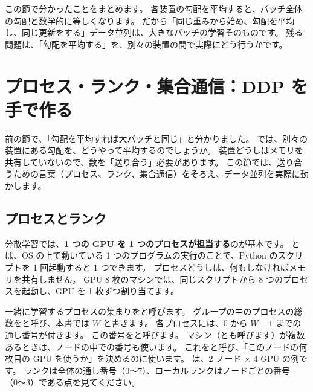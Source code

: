 この節で分かったことをまとめます。
各装置の勾配を平均すると、バッチ全体の勾配と数学的に等しくなります。
だから「同じ重みから始め、勾配を平均し、同じ更新をする」データ並列は、大きなバッチの学習そのものです。
残る問題は、「勾配を平均する」を、別々の装置の間で実際にどう行うかです。

\section{プロセス・ランク・集合通信：DDP を手で作る}\label{sec:dist-ddp}

前の節で、「勾配を平均すれば大バッチと同じ」と分かりました。
では、別々の装置にある勾配を、どうやって平均するのでしょうか。
装置どうしはメモリを共有していないので、数を「送り合う」必要があります。
この節では、送り合うための言葉（プロセス、ランク、集合通信）をそろえ、データ並列を実際に動かします。

\subsection*{プロセスとランク}

分散学習では、\textbf{1 つの GPU を 1 つのプロセスが担当する}のが基本です。
とは、OS の上で動いている 1 つのプログラムの実行のことで、Python のスクリプトを 1 回起動すると 1 つできます。
プロセスどうしは、何もしなければメモリを共有しません。
GPU 8 枚のマシンでは、同じスクリプトから 8 つのプロセスを起動し、GPU を 1 枚ずつ割り当てます。

一緒に学習するプロセスの集まりをと呼びます。
グループの中のプロセスの総数をと呼び、本書では $W$ と書きます。
各プロセスには、0 から $W-1$ までの通し番号が付きます。
この番号をと呼びます。
マシン（とも呼びます）が複数あるときは、ノードの中での番号も使います。
これをと呼び、「このノードの何枚目の GPU を使うか」を決めるのに使います。
は、2 ノード × 4 GPU の例です。
ランクは全体の通し番号（0〜7）、ローカルランクはノードごとの番号（0〜3）である点を見てください。

